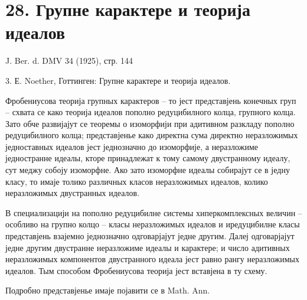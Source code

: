 ﻿\documentclass[11pt]{article}
\begin{document}
\section*{28. Групне карактере и теорија идеалов}

\begin{center}
J. Ber. d. DMV 34 (1925), стр. 144
\end{center}

3. Е. Noether, Готтинген: Групне карактере и теорија идеалов.

Фробениусова теорија групных карактеров -- то јест представјень конечных груп -- схвата се како теорија идеалов пополно редуцибилного колца, групного колца. Зато обче развијајут се теоремы о изоморфији при адитивном разкладу пополно редуцибилного колца; представјенье како директна сума директно неразложимых једноставных идеалов јест једнозначно до изоморфије, а неразложиме једностранне идеалы, кторе принадлежат к тому самому двустранному идеалу, сут меджу собоју изоморфне. Ако зато изоморфне идеалы собирајут се в једну класу, то имаје толико различных класов неразложимых идеалов, колико неразложимых двустранных идеалов.

В специализацији на пополно редуцибилне системы хиперкомплексных величин -- особливо на групно колцо -- класы неразложимых идеалов и иредуцибилне класы представјень взајемно једнозначно одговарјајут једне другим. Далеј одговарјајут једне другим двустранне неразложиме идеалы и карактере; и число адитивных неразложимых компонентов двустранного идеала јест равно рангу неразложимых идеалов. Тым способом Фробениусова теорија јест вставјена в ту схему.

Подробно представјенье имаје појавити се в Math. Ann.
\end{document}
